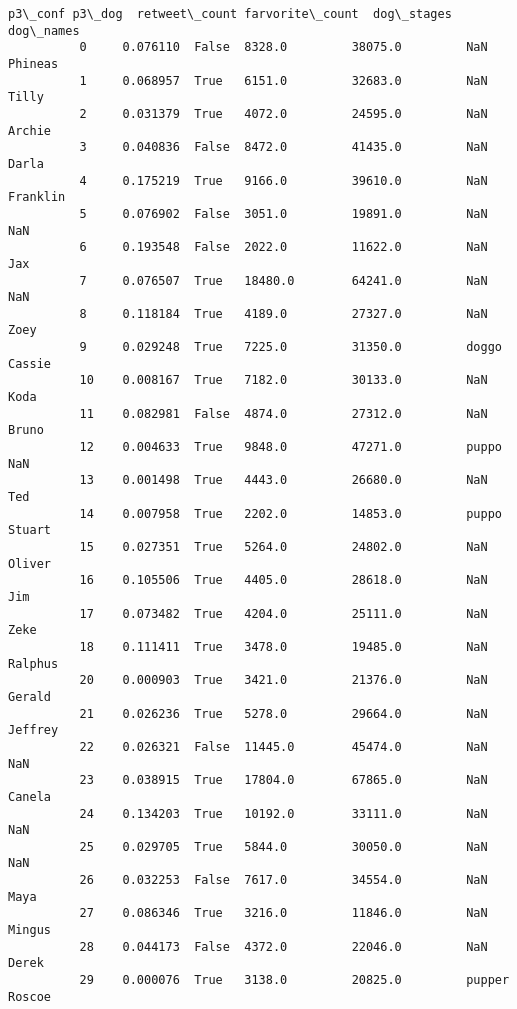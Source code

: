 \documentclass[11pt]{article}
\begin{document}
\begin{Verbatim}[commandchars=\\\{\}]
                 p3\_conf p3\_dog  retweet\_count farvorite\_count  dog\_stages  dog\_names  
          0     0.076110  False  8328.0         38075.0         NaN         Phineas    
          1     0.068957  True   6151.0         32683.0         NaN         Tilly      
          2     0.031379  True   4072.0         24595.0         NaN         Archie     
          3     0.040836  False  8472.0         41435.0         NaN         Darla      
          4     0.175219  True   9166.0         39610.0         NaN         Franklin   
          5     0.076902  False  3051.0         19891.0         NaN         NaN        
          6     0.193548  False  2022.0         11622.0         NaN         Jax        
          7     0.076507  True   18480.0        64241.0         NaN         NaN        
          8     0.118184  True   4189.0         27327.0         NaN         Zoey       
          9     0.029248  True   7225.0         31350.0         doggo       Cassie     
          10    0.008167  True   7182.0         30133.0         NaN         Koda       
          11    0.082981  False  4874.0         27312.0         NaN         Bruno      
          12    0.004633  True   9848.0         47271.0         puppo       NaN        
          13    0.001498  True   4443.0         26680.0         NaN         Ted        
          14    0.007958  True   2202.0         14853.0         puppo       Stuart     
          15    0.027351  True   5264.0         24802.0         NaN         Oliver     
          16    0.105506  True   4405.0         28618.0         NaN         Jim        
          17    0.073482  True   4204.0         25111.0         NaN         Zeke       
          18    0.111411  True   3478.0         19485.0         NaN         Ralphus    
          20    0.000903  True   3421.0         21376.0         NaN         Gerald     
          21    0.026236  True   5278.0         29664.0         NaN         Jeffrey    
          22    0.026321  False  11445.0        45474.0         NaN         NaN        
          23    0.038915  True   17804.0        67865.0         NaN         Canela     
          24    0.134203  True   10192.0        33111.0         NaN         NaN        
          25    0.029705  True   5844.0         30050.0         NaN         NaN        
          26    0.032253  False  7617.0         34554.0         NaN         Maya       
          27    0.086346  True   3216.0         11846.0         NaN         Mingus     
          28    0.044173  False  4372.0         22046.0         NaN         Derek      
          29    0.000076  True   3138.0         20825.0         pupper      Roscoe     

\end{Verbatim}
\end{document}
